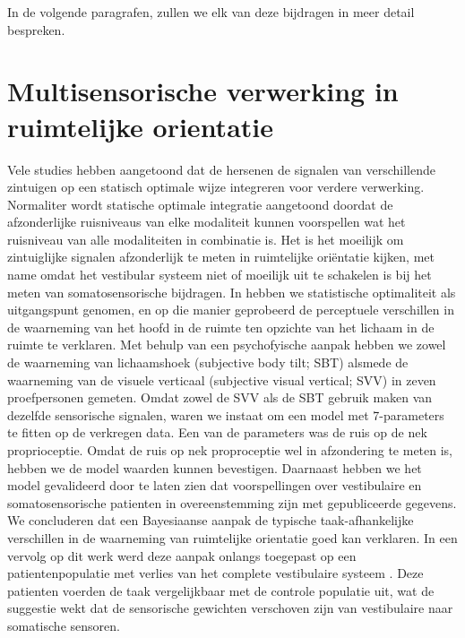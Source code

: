 In de volgende paragrafen, zullen we elk van deze bijdragen in meer detail bespreken.

\section{Multisensorische verwerking in ruimtelijke orientatie}
Vele studies hebben aangetoond dat de hersenen de signalen van verschillende zintuigen op een statisch optimale wijze integreren voor verdere verwerking. Normaliter wordt statische optimale integratie aangetoond doordat de afzonderlijke ruisniveaus van elke modaliteit kunnen voorspellen wat het ruisniveau van alle modaliteiten in combinatie is. Het is het moeilijk om zintuiglijke signalen afzonderlijk te meten in ruimtelijke oriëntatie kijken, met name omdat het vestibular systeem niet of moeilijk uit te schakelen is bij het meten van somatosensorische bijdragen.
In  hebben we statistische optimaliteit als uitgangspunt genomen, en op die manier geprobeerd de perceptuele verschillen in de waarneming van het hoofd in de ruimte ten opzichte van het lichaam in de ruimte te verklaren. Met behulp van een psychofyische aanpak hebben we zowel de waarneming van lichaamshoek (subjective body tilt; SBT) alsmede de waarneming van de visuele verticaal (subjective visual vertical; SVV) in zeven proefpersonen gemeten. Omdat zowel de SVV als de SBT gebruik maken van dezelfde sensorische signalen, waren we instaat om een model met 7-parameters te fitten op de verkregen data. Een van de parameters was de ruis op de nek proprioceptie. Omdat de ruis op nek proproceptie wel in afzondering te meten is, hebben we de model waarden kunnen bevestigen. Daarnaast hebben we het model gevalideerd door te laten zien dat voorspellingen over vestibulaire en somatosensorische patienten in overeenstemming zijn met gepubliceerde gegevens. We concluderen dat een Bayesiaanse aanpak de typische taak-afhankelijke verschillen in de waarneming van ruimtelijke orientatie goed kan verklaren. In een vervolg op dit werk werd deze aanpak onlangs toegepast op een patientenpopulatie met verlies van het complete vestibulaire systeem \cite{alberts2015}. Deze patienten voerden de taak vergelijkbaar met de controle populatie uit, wat de suggestie wekt dat de sensorische gewichten verschoven zijn van vestibulaire naar somatische sensoren.  


